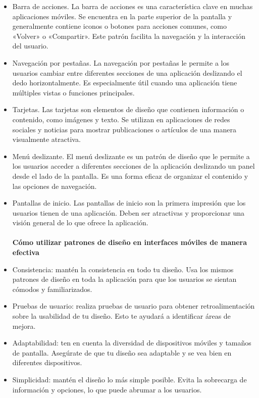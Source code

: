 \documentclass[12pt,twocolumn]{article}
\begin{document}
\begin{itemize}
	\item Barra de acciones. La barra de acciones es una característica clave en muchas aplicaciones móviles. Se encuentra en la parte superior de la pantalla y generalmente contiene iconos o botones para acciones comunes, como «Volver» o «Compartir». Este patrón facilita la navegación y la interacción del usuario.
	\item Navegación por pestañas. La navegación por pestañas le permite a los usuarios cambiar entre diferentes secciones de una aplicación deslizando el dedo horizontalmente. Es especialmente útil cuando una aplicación tiene múltiples vistas o funciones principales.
	\item Tarjetas. Las tarjetas son elementos de diseño que contienen información o contenido, como imágenes y texto. Se utilizan en aplicaciones de redes sociales y noticias para mostrar publicaciones o artículos de una manera visualmente atractiva.
	\item Menú deslizante. El menú deslizante es un patrón de diseño que le permite a los usuarios acceder a diferentes secciones de la aplicación deslizando un panel desde el lado de la pantalla. Es una forma eficaz de organizar el contenido y las opciones de navegación.
	\item Pantallas de inicio. Las pantallas de inicio son la primera impresión que los usuarios tienen de una aplicación. Deben ser atractivas y proporcionar una visión general de lo que ofrece la aplicación.
	\\
	\\
	\textbf{Cómo utilizar patrones de diseño en interfaces móviles de manera efectiva}
	\item Consistencia: mantén la consistencia en todo tu diseño. Usa los mismos patrones de diseño en toda la aplicación para que los usuarios se sientan cómodos y familiarizados.
	\item Pruebas de usuario: realiza pruebas de usuario para obtener retroalimentación sobre la usabilidad de tu diseño. Esto te ayudará a identificar áreas de mejora.
	\item Adaptabilidad: ten en cuenta la diversidad de dispositivos móviles y tamaños de pantalla. Asegúrate de que tu diseño sea adaptable y se vea bien en diferentes dispositivos.
	\item Simplicidad: mantén el diseño lo más simple posible. Evita la sobrecarga de información y opciones, lo que puede abrumar a los usuarios.
	
\end{itemize}
\end{document}
